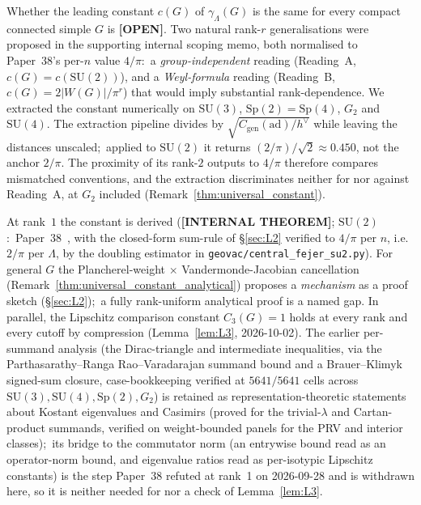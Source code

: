 \documentclass[11pt,a4paper]{article}
\theoremstyle{plain}
\theoremstyle{definition}
\newcommand{\Lammax}{\Lambda}
\newcommand{\SU}{\mathrm{SU}}
\newcommand{\Sp}{\mathrm{Sp}}
\begin{document}
Whether the leading constant $c(G)$ of $\gamma_\Lammax(G)$ is the same
for every compact connected simple $G$ is \textbf{[OPEN]}. Two natural
rank-$r$ generalisations were proposed in the supporting internal
scoping memo, both normalised to Paper~38's per-$n$ value $4/\pi$:\ a
\emph{group-independent} reading (Reading~A, $c(G) = c(\SU(2))$), and a
\emph{Weyl-formula} reading (Reading~B, $c(G) = 2|W(G)|/\pi^r$) that
would imply substantial rank-dependence. We extracted the constant
numerically on $\SU(3)$, $\Sp(2) = \Sp(4)$, $G_2$ and $\SU(4)$. The
extraction pipeline divides by $\sqrt{C_{\mathrm{gen}}(\mathrm{ad})/h^\vee}$
while leaving the distances unscaled;\ applied to $\SU(2)$ it returns
$(2/\pi)/\sqrt2 \approx 0.450$, not the anchor $2/\pi$. The proximity of
its rank-$2$ outputs to $4/\pi$ therefore compares mismatched
conventions, and the extraction discriminates neither for nor against
Reading~A, at $G_2$ included (Remark~\ref{thm:universal_constant}).

At rank~$1$ the constant is derived (\textbf{[INTERNAL THEOREM]};
$\SU(2)$:\ Paper~38~\cite{paper38}, with the closed-form sum-rule of
\S\ref{sec:L2} verified to $4/\pi$ per $n$, i.e.\ $2/\pi$ per
$\Lammax$, by the doubling estimator in
\texttt{geovac/central\_fejer\_su2.py}). For general $G$ the
Plancherel-weight $\times$ Vandermonde-Jacobian cancellation
(Remark~\ref{thm:universal_constant_analytical}) proposes a
\emph{mechanism} as a proof sketch (\S\ref{sec:L2});\ a fully
rank-uniform analytical proof is a named gap. In parallel, the
Lipschitz comparison constant $C_3(G) = 1$ holds at every rank and every
cutoff by compression (Lemma~\ref{lem:L3}, 2026-10-02).  The earlier
per-summand analysis (the Dirac-triangle and intermediate inequalities,
via the Parthasarathy--Ranga Rao--Varadarajan summand bound and a
Brauer--Klimyk signed-sum closure, case-bookkeeping verified at
$5641/5641$ cells across $\SU(3), \SU(4), \Sp(2), G_2$) is retained as
representation-theoretic statements about Kostant eigenvalues and Casimirs
(proved for the trivial-$\lambda$ and Cartan-product summands, verified on
weight-bounded panels for the PRV and interior classes);\
its bridge to the commutator norm (an entrywise bound read as an
operator-norm bound, and eigenvalue ratios read as per-isotypic
Lipschitz constants) is the step Paper~38 refuted at rank~1 on
2026-09-28 and is withdrawn here, so it is neither needed for nor a check of
Lemma~\ref{lem:L3}.
\end{document}

